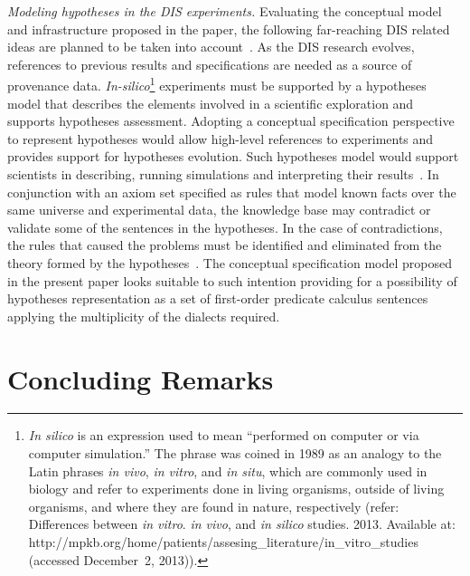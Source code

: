 \begin{multicols}{2}
  \textit{Modeling hypotheses in the DIS experiments.} Evaluating the conceptual
model and infrastructure proposed in the paper, the following far-reaching DIS related
ideas are planned to be taken into account~\cite{53-kal}. As the DIS research
evolves, references to previous results and specifications are needed as a source of
provenance data. \textit{In-silico}\footnote{\textit{In silico} is an expression used to
mean ``performed on computer or via computer simulation.'' The phrase was coined
in 1989 as an analogy to the Latin phrases \textit{in vivo}, \textit{in vitro}, and
\textit{in situ}, which are commonly used in biology and refer to experiments done in
living organisms, outside of living organisms, and where they are found in nature,
respectively (refer: Differences between \textit{in vitro}.
\textit{in vivo}, and \textit{in silico} studies. 2013.
Available at: {\sf http://mpkb.org/home/patients/assesing\_literature/in\_vitro\_studies} 
(accessed December~2, 2013)).} experiments must be
supported by a hypotheses model that describes the elements involved in a scientific
exploration and supports hypotheses assessment. Adopting a conceptual specification
perspective to represent hypotheses would allow high-level references to experiments
and provides support for hypotheses evolution. Such hypotheses model would support
scientists in describing, running simulations and interpreting their
  results~\cite{53-kal}. In conjunction with an axiom set specified as rules that
model known facts over the same universe and experimental data, the knowledge
base may contradict or validate some of the sentences in the hypotheses. In the case of
contradictions, the rules that caused the problems must be identified and eliminated
from the theory formed by the hypotheses~\cite{54-kal}. The conceptual specification
model proposed in the present paper looks suitable to such intention providing for a
possibility of hypotheses representation as a set of first-order predicate calculus
sentences applying the multiplicity of the dialects required.

\vspace*{-6pt}

\section{Concluding Remarks}

\vspace*{-2pt}


\end{multicols}
